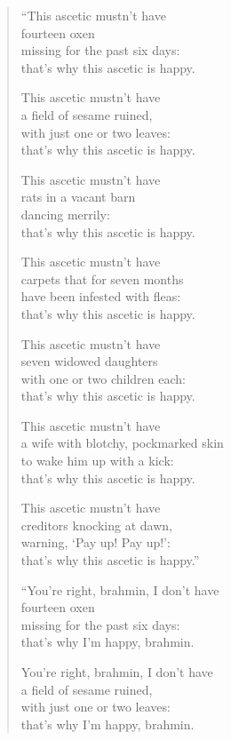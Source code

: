 \documentclass[12pt,openany]{book}%
\begin{document}
\begin{verse}%
“This ascetic mustn’t have \\
fourteen oxen \\
missing for the past six days: \\
that’s why this ascetic is happy. 

This ascetic mustn’t have \\
a field of sesame ruined, \\
with just one or two leaves: \\
that’s why this ascetic is happy. 

This ascetic mustn’t have \\
rats in a vacant barn \\
dancing merrily: \\
that’s why this ascetic is happy. 

This ascetic mustn’t have \\
carpets that for seven months \\
have been infested with fleas: \\
that’s why this ascetic is happy. 

This ascetic mustn’t have \\
seven widowed daughters \\
with one or two children each: \\
that’s why this ascetic is happy. 

This ascetic mustn’t have \\
a wife with blotchy, pockmarked skin \\
to wake him up with a kick: \\
that’s why this ascetic is happy. 

This ascetic mustn’t have \\
creditors knocking at dawn, \\
warning, ‘Pay up! Pay up!’: \\
that’s why this ascetic is happy.” 

“You’re right, brahmin, I don’t have \\
fourteen oxen \\
missing for the past six days: \\
that’s why I’m happy, brahmin. 

You’re right, brahmin, I don’t have \\
a field of sesame ruined, \\
with just one or two leaves: \\
that’s why I’m happy, brahmin. 


\end{verse}
\end{document}
